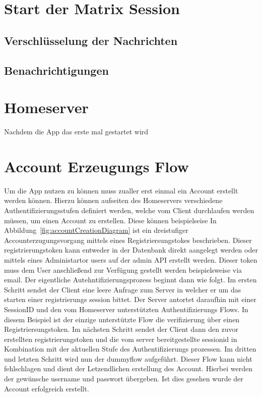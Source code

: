     \section{Start der Matrix Session}\label{sec:start-der-matrix-session}

    \subsection{Verschlüsselung der Nachrichten}

    \subsection{Benachrichtigungen}

    \section{Homeserver}\label{sec:homeserver}


    Nachdem die App das erste mal gestartet wird
    \newpage
    \section{Account Erzeugungs Flow}\label{sec:account-erzeugungs-flow}
    Um die App nutzen zu können muss zualler erst einmal ein Account erstellt werden können.
    Hierzu können aufseiten des Homeservers verschiedene Authentifizierungsstufen definiert werden, welche vom Client durchlaufen werden müssen, um einen Account zu erstellen.
    Diese können beispielseise
    In Abbildung~\ref{fig:accountCreationDiagram} ist ein dreistufiger Accounterzugungsvorgang mittels eines Registriersungstokes beschrieben.
    Dieser registrierungstoken kann entweder in der Datenbank direkt aangelegt werden oder mittels eines Administartor users auf der admin API erstellt werden.
    Dieser token muss dem User anschließend zur Verfügung gestellt werden beispielsweise via email.
    Der eigentliche Autehntifizierungsprozess beginnt dann wie folgt.
    Im ersten Schritt sendet der Client eine leere Anfrage zum Server in welcher er um das starten einer registrierungs session bittet.
    Der Server antortet daraufhin mit einer SessionID und den vom Homeserver unterstützten Authentifizierungs Flows.
    In diesem Beispiel ist der einzige unterstützte Flow die verifizierung über einen Registriersungstoken.
    Im nächsten Schritt sendet der Client dann den zuvor erstellten registrierungstoken und die vom server bereitgestellte sessionid in Kombination mit der aktuellen Stufe des Authentifizierungs prozessen.
    Im dritten und letzten Schritt wird nun der dummyflow aufgeführt.
    Dieser Flow kann nicht fehlschlagen und dient der Letzendlichen erstellung des Account.
    Hierbei werden der gewünsche username und passwort übergeben.
    Ist dies gesehen wurde der Account erfolgreich erstellt.

